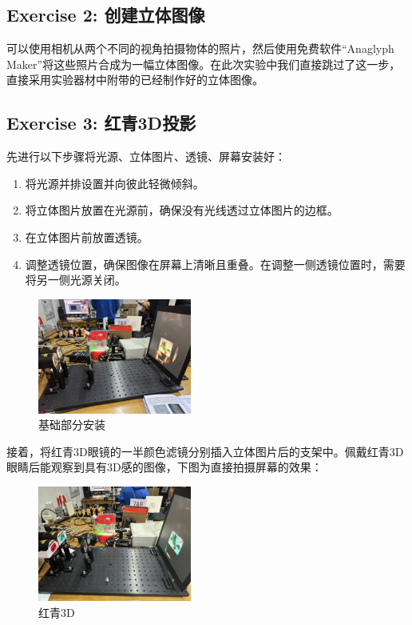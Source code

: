 \documentclass{ctexart}
\begin{document}
\subsection{Exercise 2: 创建立体图像}
可以使用相机从两个不同的视角拍摄物体的照片，然后使用免费软件“Anaglyph Maker”将这些照片合成为一幅立体图像。在此次实验中我们直接跳过了这一步，直接采用实验器材中附带的已经制作好的立体图像。

\subsection{Exercise 3: 红青3D投影}
先进行以下步骤将光源、立体图片、透镜、屏幕安装好：
\begin{enumerate}
    \item 将光源并排设置并向彼此轻微倾斜。
    \item 将立体图片放置在光源前，确保没有光线透过立体图片的边框。
    \item 在立体图片前放置透镜。
    \item 调整透镜位置，确保图像在屏幕上清晰且重叠。在调整一侧透镜位置时，需要将另一侧光源关闭。
\end{enumerate}
\begin{figure}[htbp]
    \centering
    \includegraphics[width=0.45\textwidth,height=0.3\textwidth]{pictures/微信图片_20241212140313.jpg}
    \caption{基础部分安装}
\end{figure}

接着，将红青3D眼镜的一半颜色滤镜分别插入立体图片后的支架中。佩戴红青3D眼睛后能观察到具有3D感的图像，下图为直接拍摄屏幕的效果：
\begin{figure}[H]
    \centering
    \includegraphics[width=0.45\textwidth,height=0.3\textwidth]{pictures/微信图片_20241212140316.jpg}
    \caption{红青3D}
\end{figure}
\end{document}
